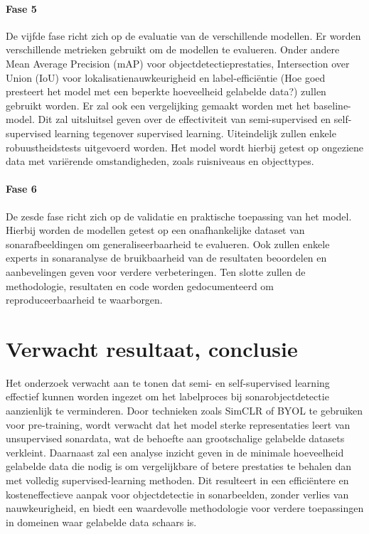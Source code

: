 \paragraph{Fase 5}

De vijfde fase richt zich op de evaluatie van de verschillende modellen. Er worden verschillende metrieken gebruikt om de modellen te evalueren. Onder andere Mean Average Precision (mAP) voor objectdetectieprestaties, Intersection over Union (IoU) voor lokalisatienauwkeurigheid en label-efficiëntie (Hoe goed presteert het model met een beperkte hoeveelheid gelabelde data?) zullen gebruikt worden. Er zal ook een vergelijking gemaakt worden met het baseline-model. Dit zal uitsluitsel geven over de effectiviteit van semi-supervised en self-supervised learning tegenover supervised learning. Uiteindelijk zullen enkele robuustheidstests uitgevoerd worden. Het model wordt hierbij getest op ongeziene data met variërende omstandigheden, zoals ruisniveaus en objecttypes.

\paragraph{Fase 6}

De zesde fase richt zich op de validatie en praktische toepassing van het model. Hierbij worden de modellen getest op een onafhankelijke dataset van sonarafbeeldingen om generaliseerbaarheid te evalueren. Ook zullen enkele experts in sonaranalyse de bruikbaarheid van de resultaten beoordelen en aanbevelingen geven voor verdere verbeteringen. Ten slotte zullen de methodologie, resultaten en code worden gedocumenteerd om reproduceerbaarheid te waarborgen.

\section{Verwacht resultaat, conclusie}%
\label{sec:verwachte_resultaten}

Het onderzoek verwacht aan te tonen dat semi- en self-supervised learning effectief kunnen worden ingezet om het labelproces bij sonarobjectdetectie aanzienlijk te verminderen. Door technieken zoals SimCLR of BYOL te gebruiken voor pre-training, wordt verwacht dat het model sterke representaties leert van unsupervised sonardata, wat de behoefte aan grootschalige gelabelde datasets verkleint. Daarnaast zal een analyse inzicht geven in de minimale hoeveelheid gelabelde data die nodig is om vergelijkbare of betere prestaties te behalen dan met volledig supervised-learning methoden. Dit resulteert in een efficiëntere en kosteneffectieve aanpak voor objectdetectie in sonarbeelden, zonder verlies van nauwkeurigheid, en biedt een waardevolle methodologie voor verdere toepassingen in domeinen waar gelabelde data schaars is.

